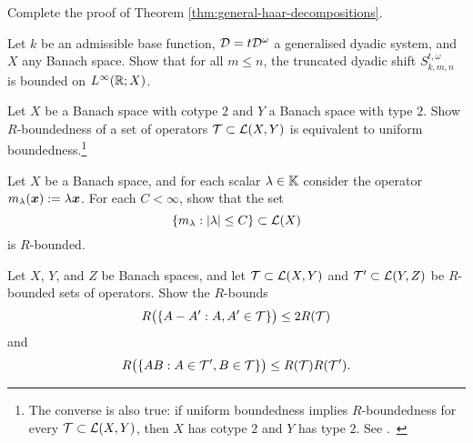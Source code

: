 \begin{exercise}\label{ex:mgale-reduction}
  Complete the proof of Theorem \ref{thm:general-haar-decompositions}.
\end{exercise}

\begin{exercise}
  Let $k$ be an admissible base function, $\mathcal{D} = t\mathcal{D}^{\omega}$ a generalised dyadic system, and $X$ any Banach space.
  Show that for all $m \leq n$, the truncated dyadic shift $S_{k,m,n}^{t,\omega}$ is bounded on $L^\infty(\mathbb{R};X)$.
\end{exercise}

\begin{exercise}\label{ex:R-bound-type}
  Let $X$ be a Banach space with cotype $2$ and $Y$ a Banach space with type $2$.
  Show $R$-boundedness of a set of operators $\mathcal{T} \subset \mathcal{L}(X,Y)$ is equivalent to uniform boundedness.\footnote{The converse is also true: if uniform boundedness implies $R$-boundedness for every $\mathcal{T} \subset \mathcal{L}(X,Y)$, then $X$ has cotype $2$ and $Y$ has type $2$. See \cite[Proposition 8.6.1]{HNVW17}.\ }
\end{exercise}

\begin{exercise}\label{ex:scalars}
  Let $X$ be a Banach space, and for each scalar $\lambda \in \mathbb{K}$ consider the operator $m_{\lambda}(\bm{x}) := \lambda \bm{x}$.
  For each $C < \infty$, show that the set
  \begin{equation*}
    \{m_{\lambda} : |\lambda| \leq C\} \subset \mathcal{L}(X)
  \end{equation*}
  is $R$-bounded.
\end{exercise}

\begin{exercise}\label{ex:R-bound-stuff}
  Let $X$, $Y$, and $Z$ be Banach spaces, and let $\mathcal{T} \subset \mathcal{L}(X,Y)$ and $\mathcal{T}' \subset \mathcal{L}(Y,Z)$ be $R$-bounded sets of operators.
  Show the $R$-bounds
  \begin{equation*}
    R\big(\{A - A' : A,A' \in \mathcal{T}\} \big) \leq 2R(\mathcal{T})
  \end{equation*}
  and
  \begin{equation*}
    R\big(\{AB : A \in \mathcal{T}', B \in \mathcal{T}\}\big) \leq R(\mathcal{T})R(\mathcal{T}').
  \end{equation*}
\end{exercise}



